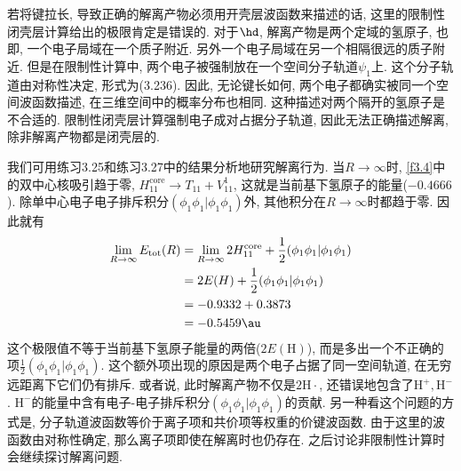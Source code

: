 若将键拉长, 导致正确的解离产物必须用开壳层波函数来描述的话, 这里的限制性闭壳层计算给出的极限肯定是错误的. 对于$\hd$, 解离产物是两个定域的氢原子, 也即, 一个电子局域在一个质子附近. 另外一个电子局域在另一个相隔很远的质子附近. 但是在限制性计算中, 两个电子被强制放在一个空间分子轨道$\psi_1$上. 这个分子轨道由对称性决定, 形式为(3.236). 因此, 无论键长如何, 两个电子都确实被同一个空间波函数描述, 在三维空间中的概率分布也相同. 这种描述对两个隔开的氢原子是不合适的. 限制性闭壳层\hft 计算强制电子成对占据分子轨道, 因此无法正确描述解离, 除非解离产物都是闭壳层的.

我们可用练习3.25和练习3.27中的结果分析地研究解离行为. 当$R\to\infty$时, \ref{f3.4}中的双中心核吸引趋于零, $H_{11}^\mathrm{core}\to T_{11}+V_{11}^1$, 这就是当前基下氢原子的能量($-0.4666$). 除单中心电子电子排斥积分$(\phi_1\phi_1|\phi_1\phi_1)$外, 其他积分在$R\to \infty$时都趋于零. 因此就有
\begin{align*}
\lim_{R\to\infty} E_\mathrm{tot}(R) & = \lim_{R\to\infty} 2H_{11}^\mathrm{core} + \frac{1}{2}(\phi_1\phi_1|\phi_1\phi_1)\\
& = 2E(H) + \frac{1}{2}(\phi_1\phi_1|\phi_1\phi_1)\\
& = -0.9332 + 0.3873\\
& = -0.5459\au
\end{align*}
这个极限值不等于当前基下氢原子能量的两倍($2E(\mathrm{H})$), 而是多出一个不正确的项$\frac{1}{2}(\phi_1\phi_1|\phi_1\phi_1)$. 这个额外项出现的原因是两个电子占据了同一空间轨道, 在无穷远距离下它们仍有排斥. 或者说, 此时解离产物不仅是$2\mathrm{H}\cdot$, 还错误地包含了$\mathrm{H}^+,\mathrm{H}^-$. $\mathrm{H}^-$的能量中含有电子-电子排斥积分$(\phi_1\phi_1|\phi_1\phi_1)$的贡献. 另一种看这个问题的方式是, 分子轨道波函数等价于离子项和共价项等权重的价键波函数. 由于这里的波函数由对称性确定, 那么离子项即使在解离时也仍存在. 之后讨论非限制性\hft 计算时会继续探讨解离问题.

